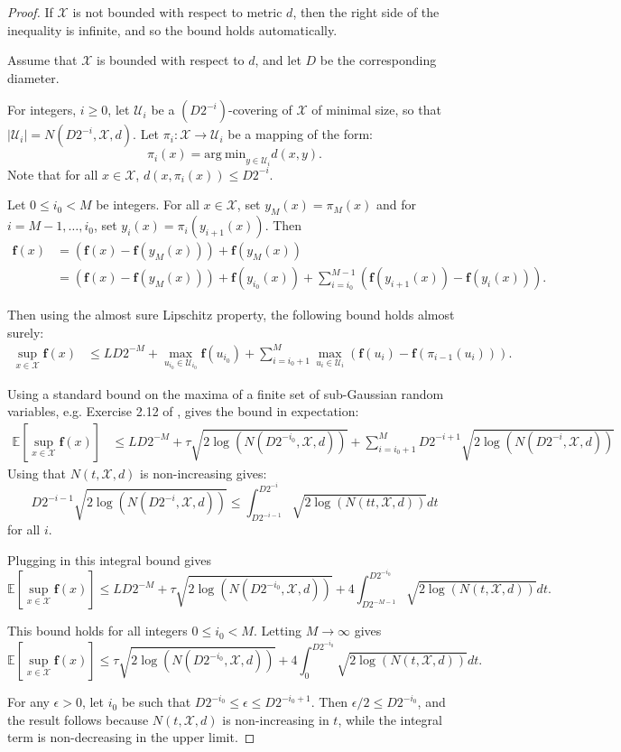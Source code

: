 \documentclass[twoside]{article}
\theoremstyle{definition}
\newcommand{\E}{\mathbb{E}}
\newcommand{\cU}{\mathcal{U}}
\newcommand{\cX}{\mathcal{X}}
\newcommand{\1}[1]{\scalebox{1.25}{$\mathds{1}$}\left[#1\right]}
\begin{document}
\begin{proof}
If $\cX$ is not bounded with respect to metric $d$, then the right side of the inequality is infinite, and so the bound holds automatically.

Assume that $\cX$ is bounded with respect to $d$, and let $D$ be the corresponding diameter. 

For integers, $i\ge 0$, let $\cU_i$ be a $(D2^{-i})$-covering of $\cX$ of minimal size, so that $|\cU_i|=N(D2^{-i},\cX,d).$ Let $\pi_i:\cX\to \cU_i$ be a mapping of the form:
$$
\pi_i(x)=\mathrm{arg\:min}_{y\in\cU_i} d(x,y).
$$
Note that for all $x\in \cX$, $d(x,\pi_i(x))\le D2^{-i}.$

Let $0\le i_0 < M$ be integers. For all $x\in\cX$, set $y_M(x)=\pi_M(x)$ and for $i=M-1,\ldots,i_0$, set $y_i(x)=\pi_{i}(y_{i+1}(x)).$ Then
\begin{align*}
\bm{f}(x)&=\left(\bm{f}(x)-\bm{f}(y_M(x))\right)+\bm{f}(y_M(x))\\
&=\left(\bm{f}(x)-\bm{f}(y_M(x))\right)+\bm{f}(y_{i_0}(x)) + \sum_{i=i_0}^{M-1}\left(
\bm{f}(y_{i+1}(x))-\bm{f}(y_{i}(x))
\right).
\end{align*}

Then using the almost sure Lipschitz property, the following bound holds almost surely:
\begin{align*}
\sup_{x\in\cX}\bm{f}(x)&\le LD 2^{-M}+\max_{u_{i_0}\in\cU_{i_0}}\bm{f}(u_{i_0})
+\sum_{i=i_0+1}^M\max_{u_i\in\cU_i}\left(\bm{f}(u_i)-\bm{f}(\pi_{i-1}(u_i))\right).
\end{align*}

Using a standard bound on the maxima of a finite set of sub-Gaussian random variables, e.g. Exercise 2.12 of \cite{wainwright2019high}, gives the bound in expectation: 
\begin{align*}
\E\left[
\sup_{x\in\cX}\bm{f}(x)
\right]&\le LD2^{-M}+\tau \sqrt{2\log(N(D2^{-i_0},\cX,d))}
+\sum_{i=i_0+1}^M D2^{-i+1}\sqrt{2\log(N(D2^{-i},\cX,d))}
\end{align*}
Using that $N(t,\cX,d)$ is non-increasing gives:
$$
D2^{-i-1} \sqrt{2\log(N(D2^{-i},\cX,d))}\le \int_{D2^{-i-1}}^{D2^{-i}}
\sqrt{2\log(N(tt,\cX,d))}dt
$$
for all $i$. 

Plugging in this integral bound gives
$$
\E\left[
\sup_{x\in\cX}\bm{f}(x)
\right]\le LD2^{-M}+\tau \sqrt{2\log(N(D2^{-i_0},\cX,d))}
+4\int_{D2^{-M-1}}^{D2^{-i_0}}
\sqrt{2\log(N(t,\cX,d))}dt.
$$

This bound holds for all integers $0\le i_0<M$. Letting $M\to \infty$ gives
$$
\E\left[
\sup_{x\in\cX}\bm{f}(x)
\right]\le \tau \sqrt{2\log(N(D2^{-i_0},\cX,d))}
+4\int_0^{D2^{-i_0}}
\sqrt{2\log(N(t,\cX,d))}dt.
$$

For any $\epsilon >0$, let $i_0$ be such that $D2^{-i_0}\le \epsilon \le D2^{-i_0+1}$. Then $\epsilon/2\le D2^{-i_0}$, and the result follows because $N(t,\cX,d)$ is non-increasing in $t$, while the integral term is non-decreasing in the upper limit. 
\end{proof}
\end{document}
